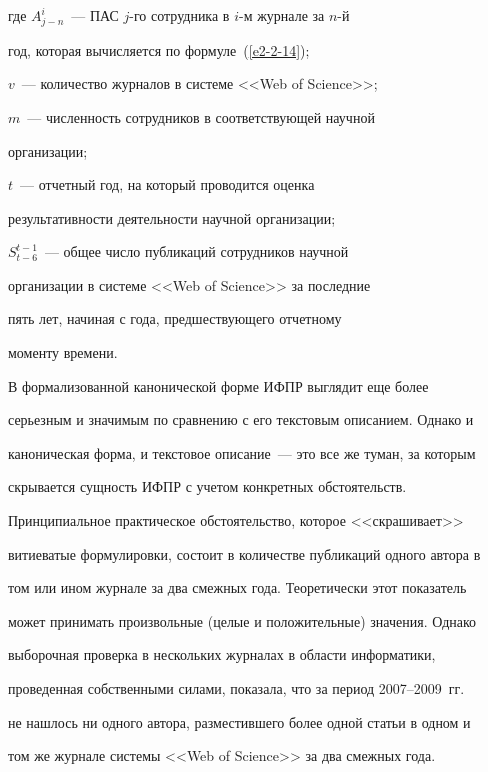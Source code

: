 где  $A^i_{j-n}$~--- ПАС $j$-го сотрудника в $i$-м журнале за $n$-й 


год, которая вы\-чис\-ля\-ет\-ся по формуле~(\ref{e2-2-14});


$v$~--- количество журналов в системе <<Web of Science>>;


$m$~--- численность сотрудников в соответствующей научной 


организации;


$t$~--- отчетный год, на который проводится оценка 


результативности деятельности научной организации;


$S_{t-6}^{t-1}$~--- общее число публикаций сотрудников научной 


организации в системе <<Web of Science>> за последние 


пять лет, начиная с года, предшествующего отчетному 


моменту времени.


    


    В формализованной канонической форме ИФПР выглядит еще более 


серь\-ез\-ным и значимым по сравнению с его текстовым описанием. Однако и 


каноническая форма, и текстовое описание~--- это все же туман, за которым 


скрывается сущность ИФПР с учетом конкретных обстоятельств. 


Принципиальное практическое обстоятельство, которое <<скрашивает>> 


витиеватые формулировки, состоит в количестве публикаций одного автора в 


том или ином журнале за два смежных года. Теоретически этот показатель 


может принимать произвольные (целые и положительные) значения. Однако 


выборочная проверка в нескольких журналах в области информатики, 


проведенная собственными силами, показала, что за период 2007--2009~гг.\ 


не нашлось ни одного автора, разместившего более одной статьи в одном и 


том же журнале системы <<Web of Science>> за два смежных года.


{ %





}


